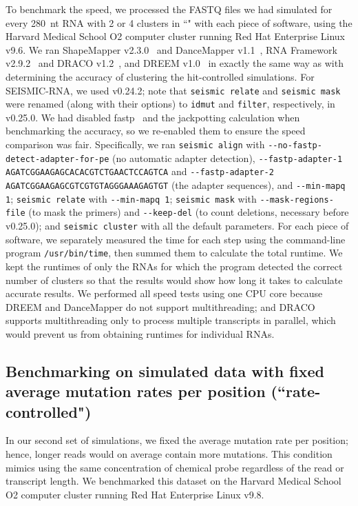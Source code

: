 \documentclass[unnumsec,webpdf,contemporary,large]{oup-authoring-template}%
\theoremstyle{thmstyleone}%
\theoremstyle{thmstyletwo}%
\theoremstyle{thmstylethree}%
\begin{document}
To benchmark the speed, we processed the FASTQ files we had simulated for every 280~nt RNA with 2 or 4 clusters in ``" with each piece of software, using the Harvard Medical School O2 computer cluster running Red Hat Enterprise Linux v9.6.
We ran ShapeMapper v2.3.0~\cite{Busan2018} and DanceMapper v1.1~\cite{Olson2022}, RNA Framework v2.9.2~\cite{Incarnato2018} and DRACO v1.2~\cite{Morandi2021}, and DREEM v1.0~\cite{Tomezsko2020} in exactly the same way as with determining the accuracy of clustering the hit-controlled simulations.
For SEISMIC-RNA, we used v0.24.2; note that \verb|seismic relate| and \verb|seismic mask| were renamed (along with their options) to \verb|idmut| and \verb|filter|, respectively, in v0.25.0.
We had disabled fastp~\cite{Chen2018} and the jackpotting calculation when benchmarking the accuracy, so we re-enabled them to ensure the speed comparison was fair.
Specifically, we ran \verb|seismic align| with \verb|--no-fastp-detect-adapter-for-pe| (no automatic adapter detection), \verb|--fastp-adapter-1 AGATCGGAAGAGCACACGTCTGAACTCCAGTCA| and \verb|--fastp-adapter-2 AGATCGGAAGAGCGTCGTGTAGGGAAAGAGTGT| (the adapter sequences), and \verb|--min-mapq 1|; \verb|seismic relate| with \verb|--min-mapq 1|; \verb|seismic mask| with \verb|--mask-regions-file| (to mask the primers) and \verb|--keep-del| (to count deletions, necessary before v0.25.0); and \verb|seismic cluster| with all the default parameters.
For each piece of software, we separately measured the time for each step using the command-line program \verb|/usr/bin/time|, then summed them to calculate the total runtime.
We kept the runtimes of only the RNAs for which the program detected the correct number of clusters so that the results would show how long it takes to calculate accurate results.
We performed all speed tests using one CPU core because DREEM and DanceMapper do not support multithreading; and DRACO supports multithreading only to process multiple transcripts in parallel, which would prevent us from obtaining runtimes for individual RNAs.


\subsection{Benchmarking on simulated data with fixed average mutation rates per position (``rate-controlled")}

In our second set of simulations, we fixed the average mutation rate per position; hence, longer reads would on average contain more mutations.
This condition mimics using the same concentration of chemical probe regardless of the read or transcript length.
We benchmarked this dataset on the Harvard Medical School O2 computer cluster running Red Hat Enterprise Linux v9.8.
\end{document}
